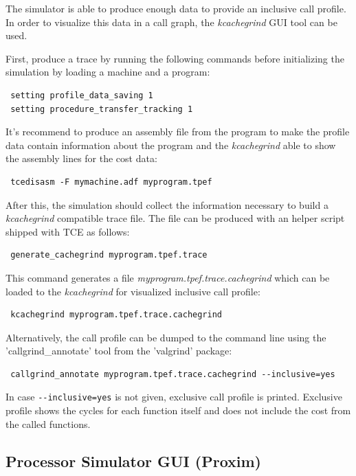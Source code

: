 \documentclass[a4paper,twoside]{tceusermanual}
\begin{document}
The simulator is able to produce enough data to provide an inclusive call 
profile. In order to visualize this data in a call graph, the \textit{kcachegrind}
GUI tool can be used.

First, produce a trace by running the following commands
before initializing the simulation by loading a machine and a program:

\begin{verbatim}
 setting profile_data_saving 1
 setting procedure_transfer_tracking 1
\end{verbatim}

It's recommend to produce an assembly file from the program to make the
profile data contain information about the program and the 
\textit{kcachegrind} able to show the assembly lines for the cost data:

\begin{verbatim}
 tcedisasm -F mymachine.adf myprogram.tpef
\end{verbatim}

After this, the simulation should collect the information necessary to build
a \textit{kcachegrind} compatible trace file. The file can be produced with an
helper script shipped with TCE as follows:

\begin{verbatim}
 generate_cachegrind myprogram.tpef.trace
\end{verbatim}

This command generates a file \textit{myprogram.tpef.trace.cachegrind} which 
can be loaded to the \textit{kcachegrind} for visualized inclusive call
profile:

\begin{verbatim}
 kcachegrind myprogram.tpef.trace.cachegrind
\end{verbatim}

Alternatively, the call profile can be dumped to the command line using
the 'callgrind\_annotate' tool from the 'valgrind' package:

\begin{verbatim}
 callgrind_annotate myprogram.tpef.trace.cachegrind --inclusive=yes
\end{verbatim}

In case \verb|--inclusive=yes| is not given, exclusive call profile is printed.
Exclusive profile shows the cycles for each function itself and does not
include the cost from the called functions.


\subsection{Processor Simulator GUI (Proxim)}
\label{section:proxim}
\end{document}
